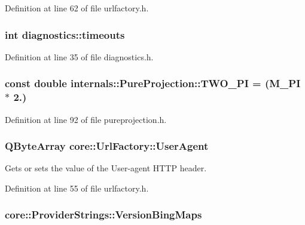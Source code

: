 \-Definition at line 62 of file urlfactory.\-h.

\hypertarget{group___o_p_map_widget_ga9f4f4d5bc0d01d665175028f4ea970c7}{
\subsubsection[{timeouts}]{\setlength{\rightskip}{0pt plus 5cm}int {\bf diagnostics\-::timeouts}}}\label{group___o_p_map_widget_ga9f4f4d5bc0d01d665175028f4ea970c7}


\-Definition at line 35 of file diagnostics.\-h.

\hypertarget{group___o_p_map_widget_gac2ca007c6c6f6c095902daca2254d4bb}{
\subsubsection[{\-T\-W\-O\-\_\-\-P\-I}]{\setlength{\rightskip}{0pt plus 5cm}const double {\bf internals\-::\-Pure\-Projection\-::\-T\-W\-O\-\_\-\-P\-I} = (\-M\-\_\-\-P\-I $\ast$ 2.)}}\label{group___o_p_map_widget_gac2ca007c6c6f6c095902daca2254d4bb}


\-Definition at line 92 of file pureprojection.\-h.

\hypertarget{group___o_p_map_widget_ga9dbf3d049cf1947db76a0c87dd0821fc}{
\subsubsection[{\-User\-Agent}]{\setlength{\rightskip}{0pt plus 5cm}\-Q\-Byte\-Array {\bf core\-::\-Url\-Factory\-::\-User\-Agent}}}\label{group___o_p_map_widget_ga9dbf3d049cf1947db76a0c87dd0821fc}


\-Gets or sets the value of the \-User-\/agent \-H\-T\-T\-P header. 



\-Definition at line 55 of file urlfactory.\-h.

\hypertarget{group___o_p_map_widget_ga98d1eeb119258d3fb9fab1a550604eb0}{
\subsubsection[{\-Version\-Bing\-Maps}]{ {\bf core\-::\-Provider\-Strings\-::\-Version\-Bing\-Maps}}}\label{group___o_p_map_widget_ga98d1eeb119258d3fb9fab1a550604eb0}


